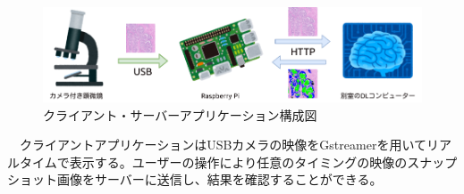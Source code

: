 \vspace{1zh}

\begin{figure}\centering
  \includegraphics[width=\columnwidth]{assets/arch.png}
  \caption{クライアント・サーバーアプリケーション構成図}
  \label{fig:arch}
\end{figure}

　クライアントアプリケーションはUSBカメラの映像をGstreamerを用いてリアルタイムで表示する。ユーザーの操作により任意のタイミングの映像のスナップショット画像をサーバーに送信し、結果を確認することができる。
